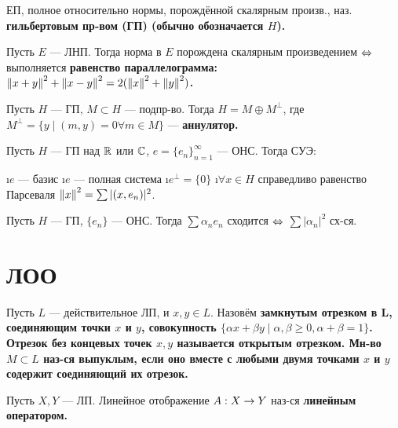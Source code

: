 \begin{defn}
ЕП, полное относительно нормы, порождённой скалярным произв., наз. \bf{гильбертовым пр-вом (ГП)} (обычно обозначается $H$).
\end{defn}

\begin{thm}[4.2]
Пусть $E$ --- ЛНП. Тогда норма в $E$ порождена скалярным произведением $\Leftrightarrow$ выполняется \bf{равенство параллелограмма}: $\left\lVert x+y\right\rVert^2+\left\lVert x-y\right\rVert^2 = 2(\left\lVert x\right\rVert^2+\left\lVert y\right\rVert^2)$.
\end{thm}

\begin{thm}
Пусть $H$ --- ГП, $M \subset H$ --- подпр-во. Тогда $H = M \oplus M^\perp$, где $M^\perp = \{y \mid (m, y) = 0 \forall m \in M\}$ --- \bf{аннулятор}.
\end{thm}

\begin{thm}[4.4]
Пусть $H$ --- ГП над $\mathbb{R}$ или $\mathbb{C}$, $e = \{e_n\}_{n=1}^\infty$ --- ОНС. Тогда СУЭ:
\begin{enumerate}
\i $e$ --- базис
\i $e$ --- полная система
\i $e^\perp = \{0\}$
\i $\forall x \in H$ справедливо равенство Парсеваля $\left\lVert x\right\rVert^2 = \sum |(x, e_n)|^2$.
\end{enumerate}
\end{thm}

\begin{thm}
Пусть $H$ --- ГП, $\{e_n\}$ --- ОНС. Тогда $\sum \alpha_n e_n$ сходится $\Leftrightarrow$ $\sum |\alpha_n|^2$ сх-ся.
\end{thm}

\section{ЛОО}

\begin{defn}
Пусть $L$ --- действительное ЛП, и $x, y \in L$. Назовём \bf{замкнутым отрезком} в L, соединяющим точки $x$ и $y$, совокупность $\{\alpha x + \beta y \mid \alpha, \beta \ge 0, \alpha + \beta = 1\}$. Отрезок без концевых точек $x, y$ называется \bf{открытым отрезком}.
Мн-во $M \subset L$ наз-ся выпуклым, если оно вместе с любыми двумя точками $x$ и $y$ содержит соединяющий их отрезок.
\end{defn}

\begin{defn}
Пусть $X, Y$ --- ЛП. Линейное отображение $A: X \rightarrow Y$ наз-ся \bf{линейным оператором}.
\end{defn}

